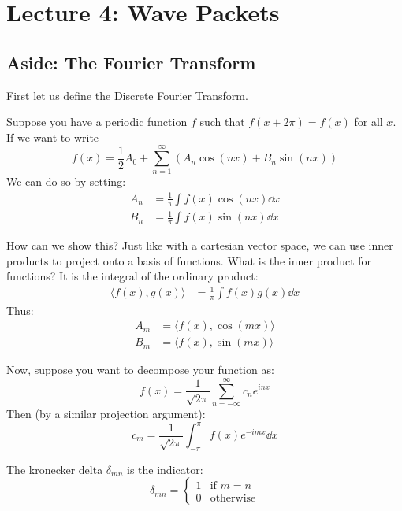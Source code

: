 \section{Lecture 4: Wave Packets}

\subsection{Aside: The Fourier Transform}
First let us define the Discrete Fourier Transform.

\begin{theorem}
    Suppose you have a periodic function $f$ such that $f(x + 2\pi) = f(x)$ for all $x$. If we want to write
    \[ f(x) = \frac{1}{2} A_0 + \sum_{n = 1}^{\infty} (A_n \cos(nx) + B_n \sin(nx)) \]
    We can do so by setting:
    \begin{align*}
        A_n &= \frac{1}{\pi} \int f(x) \cos(nx) \dd{x} \\
        B_n &= \frac{1}{\pi} \int f(x) \sin(nx) \dd{x}
    \end{align*}
\end{theorem}

How can we show this?
Just like with a cartesian vector space, we can use inner products to project onto a basis of functions.
What is the inner product for functions? It is the integral of the ordinary product:
\begin{align*}
    \langle f(x), g(x) \rangle &= \frac{1}{\pi} \int f(x) g(x) \dd{x}
\end{align*}
Thus:
\begin{align*}
    A_m &= \langle f(x), \cos(mx) \rangle \\
    B_m &= \langle f(x), \sin(mx) \rangle
\end{align*}

Now, suppose you want to decompose your function as:
\[
    f(x) = \frac{1}{\sqrt{2\pi}} \sum_{n = -\infty}^{\infty} c_n e^{inx}
\]
Then (by a similar projection argument):
\[ c_m = \frac{1}{\sqrt{2\pi}} \int_{-\pi}^{\pi} f(x) e^{-imx} \dd{x} \]

\begin{definition}
    The kronecker delta $\delta_{m n}$ is the indicator:
    \[ \delta_{mn} = \begin{cases}
        1 & \text{if $m = n$} \\
        0 & \text{otherwise}
    \end{cases} \]
\end{definition}

